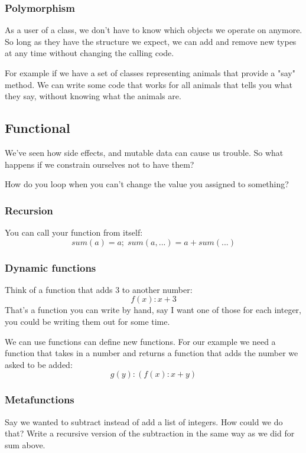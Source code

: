 \documentclass{article}
\begin{document}
\subsubsection{Polymorphism}
As a user of a class, we don't have to know which objects we operate on anymore.
So long as they have the structure we expect, we can add and remove new types
at any time without changing the calling code.

For example if we have a set of classes representing animals that provide a
"say" method. We can write some code that works for all animals that tells you
what they say, without knowing what the animals are.

\subsection{Functional}
We've seen how side effects, and mutable data can cause us trouble.
So what happens if we constrain ourselves not to have them?

How do you loop when you can't change the value you assigned to something?
\subsubsection{Recursion}
You can call your function from itself:
\begin{displaymath}
sum(a) = a ;\; sum(a, ...) = a + sum(...)
\end{displaymath}

\subsubsection{Dynamic functions}
Think of a function that adds 3 to another number:
\begin{displaymath}
f(x): x + 3
\end{displaymath}
That's a function you can write by hand, say I want one of those for each
integer, you could be writing them out for some time.

We can use functions can define new functions.
For our example we need a function that takes in a number and returns a
function that adds the number we asked to be added:
\begin{displaymath}
g(y): (f(x): x + y)
\end{displaymath}

\subsubsection{Metafunctions}
Say we wanted to subtract instead of add a list of integers.
How could we do that?
Write a recursive version of the subtraction in the same way as we did for sum
above.
\end{document}
